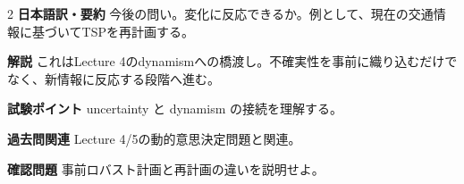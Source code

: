 \begin{minipage}[t][0.47\textheight][t]{\textwidth}
\scriptsize
\setlength{\parskip}{1.2pt}
\begin{multicols}{2}
\noindent\textbf{日本語訳・要約}\; 今後の問い。変化に反応できるか。例として、現在の交通情報に基づいてTSPを再計画する。\par

\noindent\textbf{解説}\; これはLecture 4のdynamismへの橋渡し。不確実性を事前に織り込むだけでなく、新情報に反応する段階へ進む。\par

\noindent\textbf{試験ポイント}\; uncertainty と dynamism の接続を理解する。\par

\noindent\textbf{過去問関連}\; Lecture 4/5の動的意思決定問題と関連。\par

\noindent\textbf{確認問題}\; 事前ロバスト計画と再計画の違いを説明せよ。\par

\end{multicols}
\end{minipage}